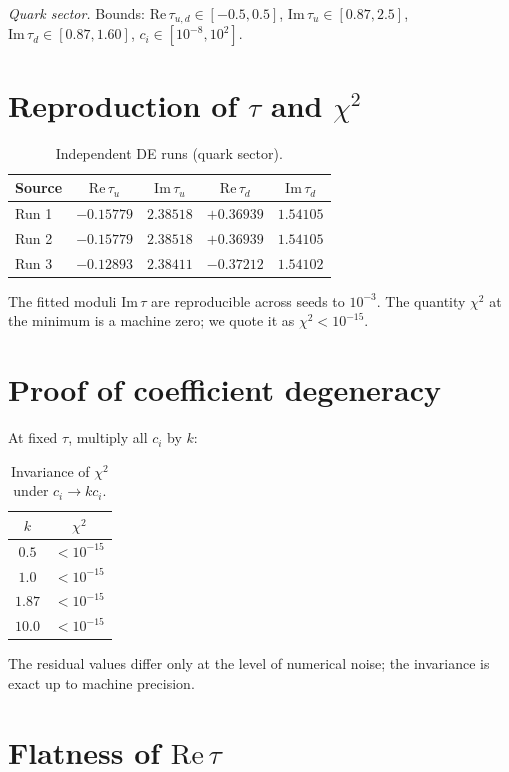 \documentclass[12pt,a4paper]{article}
\numberwithin{equation}{section}
\begin{document}
\emph{Quark sector.} Bounds:
\(\mathrm{Re}\,\tau_{u,d} \in [-0.5, 0.5]\),
\(\mathrm{Im}\,\tau_u \in [0.87, 2.5]\),
\(\mathrm{Im}\,\tau_d \in [0.87, 1.60]\),
\(c_i \in [10^{-8}, 10^2]\).

\section{Reproduction of \(\tau\) and \(\chi^2\)}
\begin{table}[H]
\centering
\caption{Independent DE runs (quark sector).}
\begin{tabular}{lcccc}
\toprule
Source & \(\mathrm{Re}\,\tau_u\) & \(\mathrm{Im}\,\tau_u\) & \(\mathrm{Re}\,\tau_d\) & \(\mathrm{Im}\,\tau_d\) \\
\midrule
Run 1 & \(-0.15779\) & \(2.38518\) & \(+0.36939\) & \(1.54105\) \\
Run 2 & \(-0.15779\) & \(2.38518\) & \(+0.36939\) & \(1.54105\) \\
Run 3 & \(-0.12893\) & \(2.38411\) & \(-0.37212\) & \(1.54102\) \\
\bottomrule
\end{tabular}
\end{table}
The fitted moduli \(\mathrm{Im}\,\tau\) are reproducible across seeds to \(10^{-3}\). The quantity \(\chi^2\) at the minimum is a machine zero; we quote it as \(\chi^2 < 10^{-15}\).

\section{Proof of coefficient degeneracy}
At fixed \(\tau\), multiply all \(c_i\) by \(k\):
\begin{table}[H]
\centering
\caption{Invariance of \(\chi^2\) under \(c_i \to k c_i\).}
\begin{tabular}{cc}
\toprule
\(k\) & \(\chi^2\) \\
\midrule
\(0.5\)  & \(<10^{-15}\) \\
\(1.0\)  & \(<10^{-15}\) \\
\(1.87\) & \(<10^{-15}\) \\
\(10.0\) & \(<10^{-15}\) \\
\bottomrule
\end{tabular}
\end{table}
The residual values differ only at the level of numerical noise; the invariance is exact up to machine precision.

\section{Flatness of \(\mathrm{Re}\,\tau\)}
\end{document}
